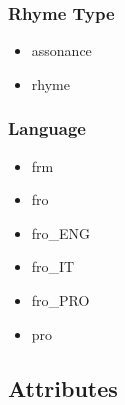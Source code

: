 \subsubsection{Rhyme Type}
\begin{itemize}
    \item assonance
    \item rhyme
\end{itemize}

\subsubsection{Language}
\begin{itemize}
    \item frm
    \item fro
    \item fro\_ENG
    \item fro\_IT
    \item fro\_PRO
    \item pro
\end{itemize}

\subsection{Attributes}

